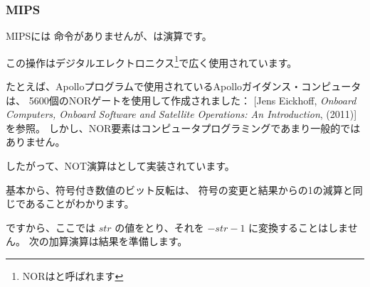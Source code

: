 ﻿\subsubsection{MIPS}




MIPSには \NOT 命令がありませんが、\NOR は演算です。

この操作はデジタルエレクトロニクス\footnote{NORはと呼ばれます}で広く使用されています。 

たとえば、Apolloプログラムで使用されているApolloガイダンス・コンピュータは、
5600個のNORゲートを使用して作成されました：
[Jens Eickhoff, \emph{Onboard Computers, Onboard Software and Satellite Operations: An Introduction}, (2011)]を参照。
しかし、NOR要素はコンピュータプログラミングであまり一般的ではありません。

したがって、NOT演算はとして実装されています。

基本から、符号付き数値のビット反転は、
符号の変更と結果からの1の減算と同じであることがわかります。

ですから、ここでは $str$ の値をとり、それを $-str-1$ に変換することはしません。 
次の加算演算は結果を準備します。
